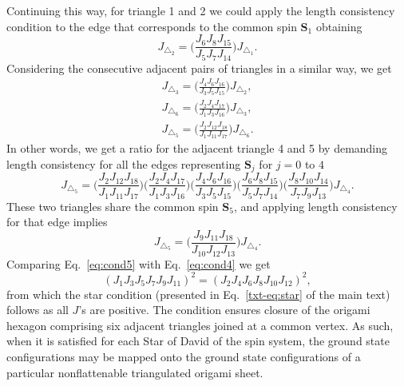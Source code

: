 \documentclass[a4paper,aps,prl,floatfix,showpacs,superscriptaddress,notitlepage]{revtex4-1}
\def\spin{\mathbf{S}} %
\begin{document}
%
Continuing this way, for triangle 1 and 2 we could apply the length consistency condition to the edge that corresponds to the common spin $\spin_1$ obtaining
\begin{equation}
 J_{\triangle_2} = \bigg(\frac{J_6J_{8}J_{15}}{J_5J_7J_{14}}\bigg)J_{\triangle_1}.
 \label{eq:cond2}
\end{equation}
Considering the consecutive adjacent pairs of triangles in a similar way, we get
\begin{equation}
 \begin{split}
  J_{\triangle_3} = \bigg(\frac{J_4J_{6}J_{16}}{J_3J_5J_{15}}\bigg)J_{\triangle_2}, \\
  J_{\triangle_6} = \bigg(\frac{J_2J_{4}J_{17}}{J_1J_3J_{16}}\bigg)J_{\triangle_3}, \\
  J_{\triangle_5} = \bigg(\frac{J_2J_{12}J_{18}}{J_1J_{11}J_{17}}\bigg)J_{\triangle_6}.
 \end{split}
 \label{eq:cond3}
\end{equation}
In other words, we get a ratio for the adjacent triangle 4 and 5 by demanding length consistency for all the edges representing $\spin_j$ for $j=0$ to $4$
\begin{equation}
 J_{\triangle_5} = \bigg(\frac{J_2J_{12}J_{18}}{J_1J_{11}J_{17}}\bigg)\bigg(\frac{J_2J_{4}J_{17}}{J_1J_3J_{16}}\bigg)\bigg(\frac{J_4J_{6}J_{16}}{J_3J_5J_{15}}\bigg)\bigg(\frac{J_6J_{8}J_{15}}{J_5J_7J_{14}}\bigg)\bigg(\frac{J_8J_{10}J_{14}}{J_7J_9J_{13}}\bigg) J_{\triangle_4}.
 \label{eq:cond4}
\end{equation}
These two triangles share the common spin $\spin_5$, and applying length consistency for that edge implies
\begin{equation}
 J_{\triangle_5} = \bigg(\frac{J_9J_{11}J_{18}}{J_{10}J_{12}J_{13}}\bigg)J_{\triangle_4}.
 \label{eq:cond5}
\end{equation}
Comparing Eq.~\ref{eq:cond5} with Eq.~\ref{eq:cond4} we get
\begin{equation}
  (J_{1}J_{3}J_{5}J_{7}J_{9}J_{11})^2=(J_{2}J_{4}J_{6}J_{8}J_{10}J_{12})^2,
 \label{eq:cond6}
\end{equation}
from which the star condition (presented in Eq.~\ref{txt-eq:star} of the main text) follows as all $J$'s are positive. The condition ensures closure of the origami hexagon comprising six adjacent triangles joined at a common vertex. As such, when it is satisfied for each Star of David of the spin system, the ground state configurations may be mapped onto the ground state configurations of a particular nonflattenable triangulated origami sheet. \\
\end{document}
